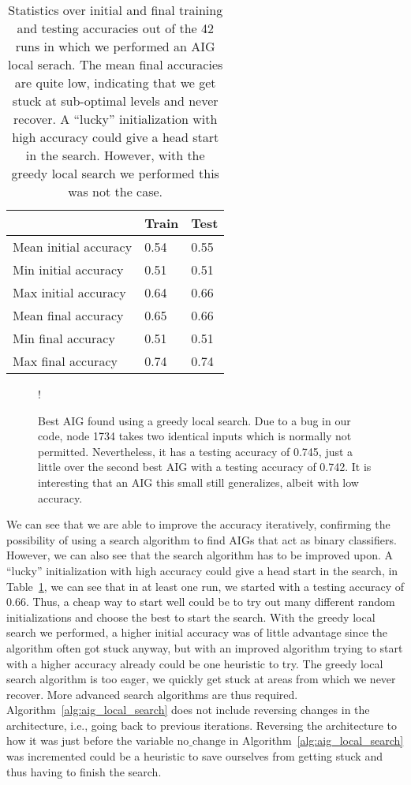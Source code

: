 \begin{table}[!htb]
  \centering
\begin{tabular}{lll}
                      & Train & Test \\ \hline
Mean initial accuracy & 0.54  & 0.55 \\
Min initial accuracy  & 0.51  & 0.51 \\
Max initial accuracy  & 0.64  & 0.66 \\
Mean final accuracy   & 0.65  & 0.66 \\
Min final accuracy    & 0.51  & 0.51 \\
Max final accuracy    & 0.74  & 0.74
\end{tabular}
\caption{Statistics over initial and final training and testing accuracies out of the 42 runs in which we performed an AIG local serach. The mean final accuracies are quite low, indicating that we get stuck at sub-optimal levels and never recover. A \enquote{lucky} initialization with high accuracy could give a head start in the search. However, with the greedy local search we performed this was not the case.}
\label{tab:aig_accuracies}
\end{table}

\begin{figure}[!htb]
  \centering
  \resizebox {.8\textwidth} {!} {
    
  }
  \caption{Best AIG found using a greedy local search. Due to a bug in our code, node 1734 takes two identical inputs which is normally not permitted. Nevertheless, it has a testing accuracy of 0.745, just a little over the second best AIG with a testing accuracy of 0.742. It is interesting that an AIG this small still generalizes, albeit with low accuracy.}
  \label{fig:best_aig}
\end{figure}
\FloatBarrier

\noindent We can see that we are able to improve the accuracy iteratively, confirming the possibility of using a search algorithm to find AIGs that act as binary classifiers. However, we can also see that the search algorithm has to be improved upon. A \enquote{lucky} initialization with high accuracy could give a head start in the search, in Table~\ref{tab:aig_accuracies}, we can see that in at least one run, we started with a testing accuracy of 0.66. Thus, a cheap way to start well could be to try out many different random initializations and choose the best to start the search. With the greedy local search we performed, a higher initial accuracy was of little advantage since the algorithm often got stuck anyway, but with an improved algorithm trying to start with a higher accuracy already could be one heuristic to try. The greedy local search algorithm is too eager, we quickly get stuck at areas from which we never recover. More advanced search algorithms are thus required. Algorithm~\ref{alg:aig_local_search} does not include reversing changes in the architecture, i.e., going back to previous iterations. Reversing the architecture to how it was just before the variable $\text{no\_change}$ in Algorithm~\ref{alg:aig_local_search} was incremented could be a heuristic to save ourselves from getting stuck and thus having to finish the search.

